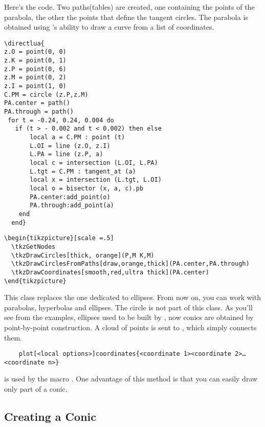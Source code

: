 Here's the code. Two paths(tables) are created, one containing the points of the parabola, the other the points that define the tangent circles.
The parabola is obtained using \TIKZ{}'s ability to draw a curve from a list of coordinates.

\begin{verbatim}
\directlua{
z.O = point(0, 0)
z.K = point(0, 1)
z.P = point(0, 6)
z.M = point(0, 2)
z.I = point(1, 0)
C.PM = circle (z.P,z.M)
PA.center = path()
PA.through = path()
 for t = -0.24, 0.24, 0.004 do
   if (t > - 0.002 and t < 0.002) then else
       local a = C.PM : point (t)
       L.OI = line (z.O, z.I)
       L.PA = line (z.P, a)
       local c = intersection (L.OI, L.PA)
       L.tgt = C.PM : tangent_at (a)
       local x = intersection (L.tgt, L.OI)
       local o = bisector (x, a, c).pb
       PA.center:add_point(o)
       PA.through:add_point(a)
    end
  end}
\end{verbatim}

\begin{verbatim}
\begin{tikzpicture}[scale =.5]
  \tkzGetNodes
  \tkzDrawCircles[thick, orange](P,M K,M)
  \tkzDrawCirclesFromPaths[draw,orange,thick](PA.center,PA.through)
  \tkzDrawCoordinates[smooth,red,ultra thick](PA.center)
\end{tikzpicture}
\end{verbatim}


This class replaces the one dedicated to ellipses. From now on, you can work with parabolas, hyperbolas and ellipses. The circle is not part of this class.
As you'll see from the examples, ellipses used to be built by \TIKZ{}, now conics are obtained by point-by-point construction. A cloud of points is sent to \TIKZ{}, which simply connects them.

\begin{mybox}
  \begin{verbatim}
    plot[<local options>]coordinates{<coordinate 1><coordinate 2>…<coordinate n>}
  \end{verbatim}
\end{mybox}

is used by the macro . One advantage of this method is that you can easily draw only part of a conic.

\subsection{Creating a Conic} %
\label{sub:creating_a_conic}

